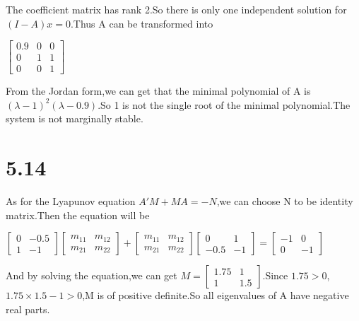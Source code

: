 \documentclass{article}
\begin{document}
The coefficient matrix has rank 2.So there is only one independent solution for $(I-A)x=0$.Thus A can be transformed into\\
\begin{center}
    $\left[\begin{array}{lll} 0.9 & 0 & 0\\0 & 1 & 1\\0 & 0 & 1\end{array}\right]$
\end{center}

From the Jordan form,we can get that the minimal polynomial of A is $(\lambda-1)^2(\lambda-0.9)$.So 1 is not the single root of the minimal polynomial.The system is not marginally stable.\\

\section*{5.14}

As for the Lyapunov equation $A'M+MA=-N$,we can choose N to be identity matrix.Then the equation will be\\
\begin{center}
    $\left[\begin{array}{ll}0 & -0.5\\1 & -1\end{array}\right]\left[\begin{array}{ll}m_{11} & m_{12}\\m_{21} & m_{22}\end{array}\right]+\left[\begin{array}{ll}m_{11} & m_{12}\\m_{21} & m_{22}\end{array}\right]\left[\begin{array}{ll}0 & 1\\-0.5 & -1\end{array}\right]=\left[\begin{array}{ll}-1 & 0\\0 & -1\end{array}\right]$
\end{center}

And by solving the equation,we can get $M=\left[\begin{array}{ll} 1.75 & 1\\1 & 1.5\end{array}\right]$.Since $1.75>0$,$1.75\times 1.5-1>0$,M is of positive definite.So all eigenvalues of A have negative real parts.\\
\end{document}
